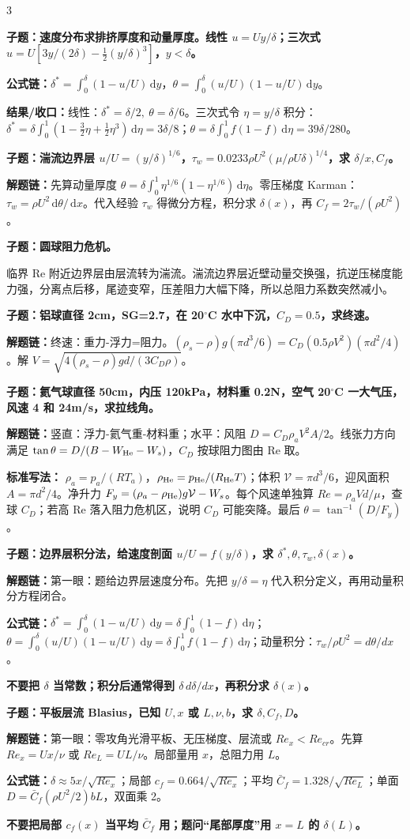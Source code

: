 \documentclass[a4paper]{article}
\newcommand{\qt}[1]{\vspace{0.25pt}\colorbox{Q}{\parbox{\dimexpr\linewidth-2\fboxsep}{\color{white}\bfseries #1}}\par}
\newcommand{\ans}[1]{\colorbox{G}{\parbox{\dimexpr\linewidth-2\fboxsep}{#1}}\par}
\newcommand{\warn}[1]{\colorbox{Y}{\parbox{\dimexpr\linewidth-2\fboxsep}{\color{E}\bfseries #1}}\par}
\newcommand{\chain}[1]{{\color{A}\bfseries 解题链：}#1\par}
\newcommand{\res}[1]{{\color{E}\bfseries 结果/收口：}#1\par}
\newcommand{\form}[1]{{\color{M}\bfseries 公式链：}#1\par}
\newcommand{\dd}{\,\mathrm d}
\begin{document}
\begin{multicols}{3}
\qt{子题：速度分布求排挤厚度和动量厚度。线性 $u=Uy/\delta$；三次式 $u=U[3y/(2\delta)-\frac12(y/\delta)^3]$，$y<\delta$。}
\form{$\delta^*=\int_0^\delta(1-u/U)\dd y$，$\theta=\int_0^\delta(u/U)(1-u/U)\dd y$。}
\res{线性：$\delta^*=\delta/2,\ \theta=\delta/6$。三次式令 $\eta=y/\delta$ 积分：$\delta^*=\delta\int_0^1(1-\frac32\eta+\frac12\eta^3)\dd\eta=3\delta/8$；$\theta=\delta\int_0^1 f(1-f)\dd\eta=39\delta/280$。}

\qt{子题：湍流边界层 $u/U=(y/\delta)^{1/6}$，$\tau_w=0.0233\rho U^2(\mu/\rho U\delta)^{1/4}$，求 $\delta/x,C_f$。}
\chain{先算动量厚度 $\theta=\delta\int_0^1\eta^{1/6}(1-\eta^{1/6})\dd\eta$。零压梯度 Karman：$\tau_w=\rho U^2\dd\theta/\dd x$。代入经验 $\tau_w$ 得微分方程，积分求 $\delta(x)$，再 $C_f=2\tau_w/(\rho U^2)$。}

\qt{子题：圆球阻力危机。}
\ans{临界 Re 附近边界层由层流转为湍流。湍流边界层近壁动量交换强，抗逆压梯度能力强，分离点后移，尾迹变窄，压差阻力大幅下降，所以总阻力系数突然减小。}

\qt{子题：铝球直径 2cm，SG=2.7，在 20$^\circ$C 水中下沉，$C_D=0.5$，求终速。}
\chain{终速：重力-浮力=阻力。$(\rho_s-\rho)g(\pi d^3/6)=C_D(0.5\rho V^2)(\pi d^2/4)$。解 $V=\sqrt{4(\rho_s-\rho)gd/(3C_D\rho)}$。}

\qt{子题：氦气球直径 50cm，内压 120kPa，材料重 0.2N，空气 20$^\circ$C 一大气压，风速 4 和 24m/s，求拉线角。}
\chain{竖直：浮力-氦气重-材料重；水平：风阻 $D=C_D\rho_aV^2A/2$。线张力方向满足 $\tan\theta=D/(B-W_{\rm He}-W_s)$，$C_D$ 按球阻力图由 Re 取。}
\ans{\textbf{标准写法：} $\rho_a=p_a/(RT_a)$，$\rho_{\rm He}=p_{\rm He}/(R_{\rm He}T)$；体积 $\mathcal V=\pi d^3/6$，迎风面积 $A=\pi d^2/4$。净升力 $F_y=(\rho_a-\rho_{\rm He})g\mathcal V-W_s$。每个风速单独算 $Re=\rho_a Vd/\mu$，查球 $C_D$；若高 Re 落入阻力危机区，说明 $C_D$ 可能突降。最后 $\theta=\tan^{-1}(D/F_y)$。}

\qt{子题：边界层积分法，给速度剖面 $u/U=f(y/\delta)$，求 $\delta^*,\theta,\tau_w,\delta(x)$。}
\chain{第一眼：题给边界层速度分布。先把 $y/\delta=\eta$ 代入积分定义，再用动量积分方程闭合。}
\form{$\delta^*=\int_0^\delta(1-u/U)\dd y=\delta\int_0^1(1-f)\dd\eta$；$\theta=\int_0^\delta(u/U)(1-u/U)\dd y=\delta\int_0^1 f(1-f)\dd\eta$；动量积分：$\tau_w/\rho U^2=d\theta/dx$。}
\warn{不要把 $\delta$ 当常数；积分后通常得到 $\delta\,d\delta/dx$，再积分求 $\delta(x)$。}

\qt{子题：平板层流 Blasius，已知 $U,x$ 或 $L,\nu,b$，求 $\delta,C_f,D$。}
\chain{第一眼：零攻角光滑平板、无压梯度、层流或 $Re_x<Re_{cr}$。先算 $Re_x=Ux/\nu$ 或 $Re_L=UL/\nu$。局部量用 $x$，总阻力用 $L$。}
\form{$\delta\approx5x/\sqrt{Re_x}$；局部 $c_f=0.664/\sqrt{Re_x}$；平均 $\bar C_f=1.328/\sqrt{Re_L}$；单面 $D=\bar C_f(\rho U^2/2)bL$，双面乘 2。}
\warn{不要把局部 $c_f(x)$ 当平均 $\bar C_f$ 用；题问“尾部厚度”用 $x=L$ 的 $\delta(L)$。}


\end{multicols}
\end{document}
